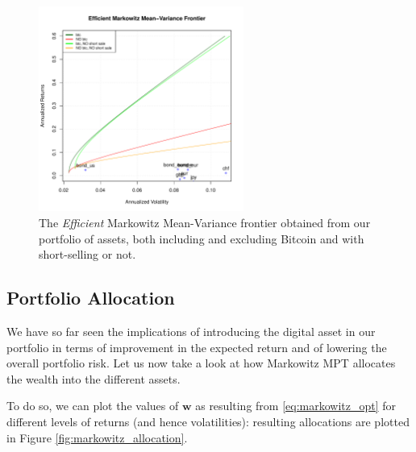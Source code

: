 \begin{figure}
	\centering
	\includegraphics[width=0.6\textwidth]{Images/efficient_frontier.pdf}
	\caption[Markowitz Efficient frontier comparison]{The \textit{Efficient} Markowitz Mean-Variance frontier obtained from our portfolio of assets, both including and excluding Bitcoin and with short-selling or not.}
	\label{fig:efficient_frontier_comparison}
\end{figure}


\subsection{Portfolio Allocation}
We have so far seen the implications of introducing the digital asset in our portfolio in terms of improvement in the expected return and of lowering the overall portfolio risk.
Let us now take a look at how Markowitz MPT allocates the wealth into the different assets.

To do so, we can plot the values of $\mathbf{w}$ as resulting from \eqref{eq:markowitz_opt} for different levels of returns (and hence volatilities): resulting allocations are plotted in Figure \ref{fig:markowitz_allocation}.


